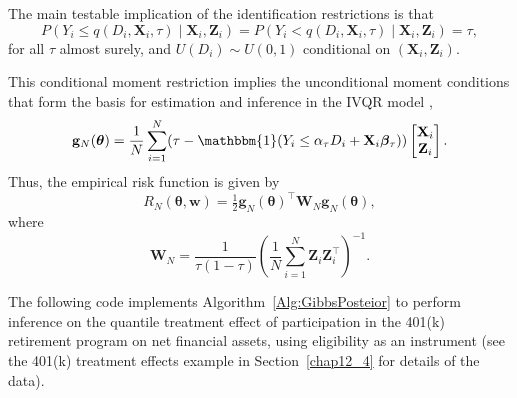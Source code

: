 The main testable implication of the identification restrictions is that
\[
P\!\left(Y_i \leq q(D_i,\mathbf{X}_i,\tau)\mid \mathbf{X}_i,\mathbf{Z}_i\right)
= P\!\left(Y_i < q(D_i,\mathbf{X}_i,\tau)\mid \mathbf{X}_i,\mathbf{Z}_i\right)
= \tau,
\]
for all $\tau$ almost surely, and $U(D_i)\sim U(0,1)$ conditional on $(\mathbf{X}_i,\mathbf{Z}_i)$.  

This conditional moment restriction implies the unconditional moment conditions that form the basis for estimation and inference in the IVQR model \cite{chernozhukov2003mcmc,chernozhukov2004effects},
\[
\mathbf{g}_N(\boldsymbol{\theta})=\frac{1}{N}\sum_{i=1}^N (\tau-\mathbbm{1}(Y_i\leq \alpha_{\tau}D_i+\mathbf{X}_i\boldsymbol{\beta}_{\tau}))\begin{bmatrix}
\mathbf{X}_i\\
\mathbf{Z}_i
\end{bmatrix}.
\]
Thus, the empirical risk function is given by 
\[
R_N(\boldsymbol{\theta},\mathbf{w})=\tfrac{1}{2}\mathbf{g}_N(\boldsymbol{\theta})^{\top}\mathbf{W}_N\mathbf{g}_N(\boldsymbol{\theta}),
\]
where
\[
\mathbf{W}_N=\frac{1}{\tau(1-\tau)}\left(\frac{1}{N}\sum_{i=1}^N \mathbf{Z}_i\mathbf{Z}_i^{\top}\right)^{-1}.
\]

The following code implements Algorithm~\ref{Alg:GibbsPosteior} to perform inference on the quantile treatment effect of participation in the 401(k) retirement program on net financial assets, using eligibility as an instrument (see the 401(k) treatment effects example in Section~\ref{chap12_4} for details of the data).

